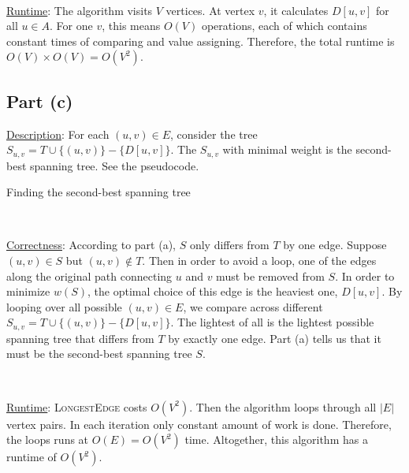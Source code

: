 \documentclass{article}
\begin{document}
~

\noindent\underline{Runtime}: The algorithm visits $V$ vertices. At vertex $v$, it calculates $D[u,v]$ for all $u\in A$. For one $v$, this means $O(V)$ operations, each of which contains constant times of comparing and value assigning. Therefore, the total runtime is $O(V)\times O(V)=O(V^2)$.

\subsection{Part (c)}
\noindent\underline{Description}: For each $(u,v)\in E$, consider the tree $S_{u,v}=T\cup\{(u,v)\}-\{D[u,v]\}$. The $S_{u,v}$ with minimal weight is the second-best spanning tree. See the pseudocode.
\begin{algorithm}
\caption{Finding the second-best spanning tree}
\begin{algorithmic}[1]
	\EndIf
\EndFor
{}
\EndProcedure
\end{algorithmic}
\end{algorithm}

~

\noindent\underline{Correctness}: According to part (a), $S$ only differs from $T$ by one edge. Suppose $(u,v)\in S$ but $(u,v)\notin T$. Then in order to avoid a loop, one of the edges along the original path connecting $u$ and $v$ must be removed from $S$. In order to minimize $w(S)$, the optimal choice of this edge is the heaviest one, $D[u,v]$. By looping over all possible $(u,v)\in E$, we compare across different $S_{u,v}=T\cup\{(u,v)\}-\{D[u,v]\}$. The lightest of all is the lightest possible spanning tree that differs from $T$ by exactly one edge. Part (a) tells us that it must be the second-best spanning tree $S$.

~

\noindent\underline{Runtime}: \textsc{LongestEdge} costs $O(V^2)$. Then the algorithm loops through all $|E|$ vertex pairs. In each iteration only constant amount of work is done. Therefore, the loops runs at $O(E)=O(V^2)$ time. Altogether, this algorithm has a runtime of $O(V^2)$.
\end{document}
